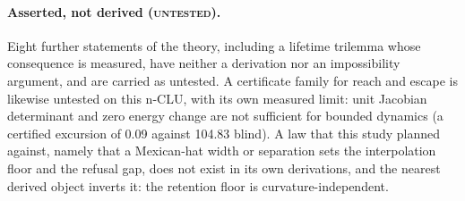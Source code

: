 \documentclass{article} %
\begin{document}
\paragraph{Asserted, not derived (\textsc{untested}).} Eight further statements of the theory,
including a lifetime trilemma whose consequence is measured, have neither a derivation nor an
impossibility argument, and are carried as untested. A certificate family for reach and escape is
likewise untested on this n-CLU, with its own measured limit: unit Jacobian determinant and zero
energy change are not sufficient for bounded dynamics (a certified excursion of 0.09 against
104.83 blind). %
A law that this study planned against, namely that a Mexican-hat width or separation sets
the interpolation floor and the refusal gap, does not exist in its own derivations, and the
nearest derived object inverts it: the retention floor is curvature-independent. %
\end{document}

